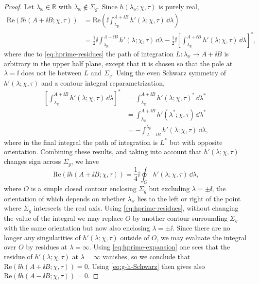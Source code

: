 \begin{proof}
Let $\lambda_\mathbb{R}\in\mathbb{R}$ with $\lambda_\mathbb{R}\not\in\Sigma_g$.
Since $h(\lambda_\mathbb{R};\chi,\tau)$ is purely real,
\begin{equation}
\begin{split}
\mathrm{Re}(\ii h(A+\ii B;\chi,\tau))&=\mathrm{Re}\left(\ii \int_{\lambda_\mathbb{R}}^{A+\ii B}h'(\lambda;\chi,\tau)\,\dd\lambda\right)\\ &= \frac{1}{2}\ii \int_{\lambda_\mathbb{R}}^{A+\ii B}h'(\lambda;\chi,\tau)\,\dd\lambda -\frac{1}{2}\ii\left[\int_{\lambda_\mathbb{R}}^{A+\ii B}h'(\lambda;\chi,\tau)\,\dd\lambda\right]^*,
\end{split}
\end{equation}
where due to \eqref{eq:hprime-residues} the path of integration $L:\lambda_\mathbb{R}\to A+\ii B$ is arbitrary in the upper half plane, except that it is chosen so that the pole at $\lambda=\ii$ does not lie between $L$ and $\Sigma_g$.  Using the even Schwarz symmetry of $h'(\lambda;\chi,\tau)$ and a contour integral reparametrization,
\begin{equation}
\begin{split}
\left[\int_{\lambda_\mathbb{R}}^{A+\ii B}h'(\lambda;\chi,\tau)\,\dd\lambda\right]^*&=\int_{\lambda_\mathbb{R}}^{A+\ii B}h'(\lambda;\chi,\tau)^*\,\dd\lambda^*\\
&=\int_{\lambda_\mathbb{R}}^{A+\ii B}h'(\lambda^*;\chi,\tau)\,\dd\lambda^*\\
&=-\int_{A-\ii B}^{\lambda_\mathbb{R}}h'(\lambda;\chi,\tau)\,\dd\lambda,
\end{split}
\end{equation}
where in the final integral the path of integration is $L^*$ but with opposite orientation.  Combining these results, and taking into account that $h'(\lambda;\chi,\tau)$ changes sign across $\Sigma_g$, we have
\begin{equation}
\mathrm{Re}(\ii h(A+\ii B;\chi,\tau))=\frac{1}{4}\ii \oint_O h'(\lambda;\chi,\tau)\,\dd\lambda,
\end{equation}
where $O$ is a simple closed contour enclosing $\Sigma_g$ but excluding $\lambda=\pm\ii$, the orientation of which depends on whether $\lambda_\mathbb{R}$ lies to the left or right of the point where $\Sigma_g$ intersects the real axis.  Using \eqref{eq:hprime-residues}, without changing the value of the integral we may replace $O$ by another contour surrounding $\Sigma_g$ with the same orientation but now also enclosing $\lambda=\pm\ii$.  Since there are no longer any singularities of $h'(\lambda;\chi,\tau)$ outside of $O$, we may evaluate the integral over $O$ by residues at $\lambda=\infty$.  Using \eqref{eq:hprime-expansion} one sees that the residue of $h'(\lambda;\chi,\tau)$ at $\lambda=\infty$ vanishes, so we conclude that $\mathrm{Re}(\ii h(A+\ii B;\chi,\tau))=0$.  Using \eqref{eq:g-h-Schwarz} then gives also $\mathrm{Re}(\ii h(A-\ii B;\chi,\tau))=0$.
\end{proof}
